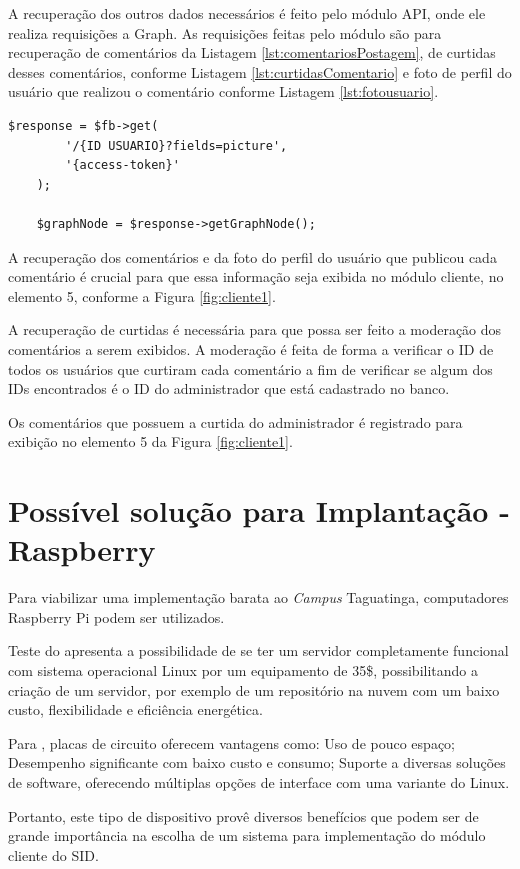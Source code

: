 A recuperação dos outros dados necessários é feito pelo módulo API, onde ele realiza requisições a Graph. As requisições feitas pelo módulo são para recuperação de comentários da Listagem \ref{lst:comentariosPostagem}, de curtidas desses comentários, conforme Listagem \ref{lst:curtidasComentario} e foto de perfil do usuário que realizou o comentário conforme Listagem \ref{lst:fotousuario}.

\begin{lstlisting}[caption={Foto de usuário},label={lst:fotousuario}]
  	$response = $fb->get(
    	'/{ID USUARIO}?fields=picture',
		'{access-token}'
	);
	
	$graphNode = $response->getGraphNode();
\end{lstlisting}

A recuperação dos comentários e da foto do perfil do usuário que publicou cada comentário é crucial para que essa informação seja exibida no módulo cliente, no elemento 5, conforme a Figura \ref{fig:cliente1}.

A recuperação de curtidas é necessária para que possa ser feito a moderação dos comentários a serem exibidos. A moderação é feita de forma a verificar o ID de todos os usuários que curtiram cada comentário a fim de verificar se algum dos IDs encontrados é o ID do administrador que está cadastrado no banco.

Os comentários que possuem a curtida do administrador é registrado para exibição no elemento 5 da Figura \ref{fig:cliente1}.

\section{Possível solução para Implantação - Raspberry}
Para viabilizar uma implementação barata ao \textit{Campus} Taguatinga, computadores Raspberry Pi podem ser utilizados.

Teste do \cite{aristotelous2016} apresenta a possibilidade de se ter um servidor completamente funcional com sistema operacional Linux por um equipamento de 35\$, possibilitando a criação de um servidor, por exemplo de um repositório na nuvem com um baixo custo, flexibilidade e eficiência energética. 

Para \cite{cusick2014}, placas de circuito oferecem vantagens como: Uso de pouco espaço; Desempenho significante com baixo custo e consumo; Suporte a diversas soluções de software, oferecendo múltiplas opções de interface com uma variante do Linux. 

Portanto, este tipo de dispositivo provê diversos benefícios que podem ser de grande importância na escolha de um sistema para implementação do módulo cliente do SID.